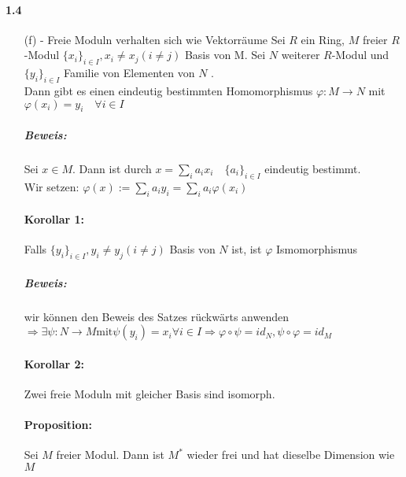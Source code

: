 \documentclass{article}
\begin{document}
	\paragraph{1.4}
	\begin{enumerate}
		\item[(f)] - Freie Moduln verhalten sich wie Vektorräume
			Sei $R$ ein Ring, $M$ freier $R$-Modul $\{x_i \}_{i  \in I}, x_i \neq x_j (i\neq j)$ Basis von M.
			Sei $N$ weiterer $R$-Modul und $\{y_i\}_{i \in I}$ Familie von Elementen von $N$ .\\
			Dann gibt es einen eindeutig bestimmten Homomorphismus $ \varphi: M\rightarrow N $ mit $\varphi(x_i)=y_i \quad \forall i \in I$

			\subparagraph{Beweis:} Sei $x \in M$. Dann ist durch $x=\sum_{i}a_ix_i\quad \{a_i\}_{i  \in I}$ eindeutig bestimmt.\\
			Wir setzen: $\varphi(x):=\sum_i a_iy_i=\sum_ia_i\varphi(x_i)$

			\paragraph{Korollar 1:} Falls $\{y_i\}_{i\in I}, y_i \neq y_j (i\neq j)$ Basis von $N$ ist, ist $\varphi$ Ismomorphismus
			\subparagraph{Beweis:} wir können den Beweis des Satzes rückwärts anwenden 
			$\Rightarrow \exists \psi: N\rightarrow M \mbox{mit} \psi(y_i)=x_i \forall i \in I 
			\Rightarrow \varphi \circ \psi = id_N, \psi \circ \varphi = id_M$

			\paragraph{Korollar 2:} Zwei freie Moduln mit gleicher Basis sind isomorph.
			\paragraph{Proposition:} Sei $M$ freier Modul. Dann ist $M^*$ wieder frei und hat dieselbe Dimension wie $M$
	\end{enumerate}
\end{document}
